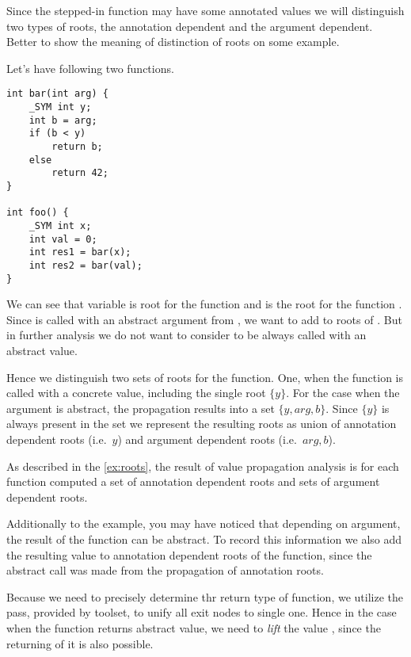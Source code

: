 Since the stepped-in function may have some annotated values we will distinguish
two types of roots, the annotation dependent and the argument dependent. Better
to show the meaning of distinction of roots on some example.

\begin{example} \label{ex:roots} Let's have following two functions.

\begin{verbatim}
int bar(int arg) {
    _SYM int y;
    int b = arg;
    if (b < y)
        return b;
    else
        return 42;
}

int foo() {
    _SYM int x;
    int val = 0;
    int res1 = bar(x);
    int res2 = bar(val);
}
\end{verbatim}
    We can see that variable  is root for the function  and
     is the root for the function . Since  is called
    with an abstract argument from , we want to add  to
    roots of . But in further analysis we do not want to consider
     to be always called with an abstract value.

    Hence we distinguish two sets of roots for the  function. One, when
    the function is called with a concrete value, including the single root
    $\{y\}$. For the case when the argument is abstract, the propagation
    results into a set $\{y, arg, b\}$. Since $\{y\}$ is always present in the
    set we represent the resulting roots as union of annotation dependent roots
    (i.e.~$y$) and argument dependent roots (i.e.~$arg, b$).
\end{example}

As described in the \autoref{ex:roots}, the result of value propagation analysis
is for each function computed a set of annotation dependent roots and sets of
argument dependent roots.

Additionally to the example, you may have noticed that depending on
argument, the result of the  function can be abstract. To record this
information we also add the resulting value  to annotation dependent
roots of the  function, since the abstract call was made from the
propagation of annotation roots.

Because we need to precisely determine thr return type of function, we utilize
the  pass, provided by \LLVM toolset, to unify all
exit nodes to single one. Hence in the case
when the  function returns abstract value, we need to \emph{lift} the
value , since the returning of it is also possible.

